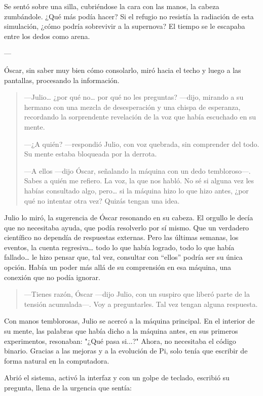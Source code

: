 \documentclass[a4paper,12pt]{book}
\begin{document}
Se sentó sobre una silla, cubriéndose la cara con las manos, la cabeza zumbándole. ¿Qué más podía hacer? Si el refugio no resistía la radiación de esta simulación, ¿cómo podría sobrevivir a la supernova? El tiempo se le escapaba entre los dedos como arena.

---

Óscar, sin saber muy bien cómo consolarlo, miró hacia el techo y luego a las pantallas, procesando la información.

\begin{quote}
    —Julio… ¿por qué no… por qué no les preguntas? —dijo, mirando a su hermano con una mezcla de desesperación y una chispa de esperanza, recordando la sorprendente revelación de la voz que había escuchado en su mente.

    —¿A quién? —respondió Julio, con voz quebrada, sin comprender del todo. Su mente estaba bloqueada por la derrota.

    —A ellos —dijo Óscar, señalando la máquina con un dedo tembloroso—. Sabes a quién me refiero. La voz, la que nos habló. No sé si alguna vez les habías consultado algo, pero… si la máquina hizo lo que hizo antes, ¿por qué no intentar otra vez? Quizás tengan una idea.
\end{quote}

Julio lo miró, la sugerencia de Óscar resonando en su cabeza. El orgullo le decía que no necesitaba ayuda, que podía resolverlo por sí mismo. Que un verdadero científico no dependía de respuestas externas. Pero las últimas semanas, los eventos, la cuenta regresiva… todo lo que había logrado, todo lo que había fallado… le hizo pensar que, tal vez, consultar con “ellos” podría ser su única opción. Había un poder más allá de su comprensión en esa máquina, una conexión que no podía ignorar.

\begin{quote}
    —Tienes razón, Óscar —dijo Julio, con un suspiro que liberó parte de la tensión acumulada—. Voy a preguntarles. Tal vez tengan alguna respuesta.
\end{quote}

Con manos temblorosas, Julio se acercó a la máquina principal. En el interior de su mente, las palabras que había dicho a la máquina antes, en sus primeros experimentos, resonaban: "¿Qué pasa si...?" Ahora, no necesitaba el código binario. Gracias a las mejoras y a la evolución de Pi, solo tenía que escribir de forma natural en la computadora.

Abrió el sistema, activó la interfaz y con un golpe de teclado, escribió su pregunta, llena de la urgencia que sentía:
\end{document}
